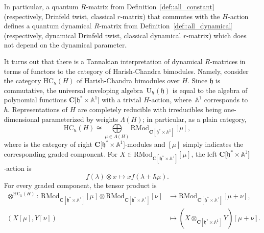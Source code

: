 \documentclass[pdftex]{sigma}
\numberwithin{equation}{section}
\newcommand{\C}{\mathbf{C}}
\newcommand{\U}{\mathrm{U}_{\hbar}}
\newcommand{\h}{\mathfrak{h}}
\newcommand{\HC}{\mathrm{HC}_{\hbar}}
\newcommand{\RMod}{\mathrm{RMod}}
\begin{document}
	\begin{Remark}
		In particular, a quantum $R$-matrix from Definition~\ref{def::all_constant} (respectively, Drinfeld twist, classical $r$-matrix) that commutes with the $H$-action defines a quantum dynamical $R$-matrix from Definition~\ref{def::all_dynamical} (respectively, dynamical Drinfeld twist, classical dynamical $r$-matrix) which does not depend on the dynamical parameter.
	\end{Remark}
	
	It turns out that there is a Tannakian interpretation of dynamical $R$-matrices in terms of functors to the category of Harish-Chandra bimodules. Namely, consider the category $\HC(H)$ of Harish-Chandra bimodules over $H$. Since $\h$ is commutative, the universal enveloping algebra~$\U(\h)$ is equal to the algebra of polynomial functions $\C\bigl[\h^* \times \mathbb{A}^1\bigr]$ with a trivial $H$-action, where~$\mathbb{A}^1$ corresponds to $\hbar$. Representations of $H$ are completely reducible with irreducibles being one-dimensional parameterized by weights $\Lambda(H)$; in particular, as a plain category,
	\[
	\HC(H) \cong \bigoplus\limits_{\mu \in \Lambda(H)} \RMod_{\C[\h^* \times \mathbb{A}^1]}[\mu],
	\]
	where \smash{$\RMod_{\C[\h \times \mathbb{A}^1]}$} is the category of right $\C\bigl[\h^* \times \mathbb{A}^1\bigr]$-modules and $[\mu]$ simply indicates the corresponding graded component. For $X\in \RMod_{\C[\h^* \times \mathbb{A}^1]}[\mu]$, the left $\C\bigl[\h^* \times \mathbb{A}^1\bigr]$-action is
	\begin{equation}
		\label{eq::hc_left_action}
		f(\lambda) \otimes x \mapsto x f(\lambda+\hbar \mu).
	\end{equation}
	For every graded component, the tensor product is
	\begin{align}
			\otimes^{\HC(H)}\colon\ \RMod_{\C[\h^* \times \mathbb{A}^1]} [\mu] \otimes \RMod_{\C[\h^* \times \mathbb{A}^1]} [\nu] & \rightarrow \RMod_{\C[\h^* \times \mathbb{A}^1]} [\mu+\nu],\nonumber \\
(X[\mu],Y[\nu]) & \mapsto (X \otimes_{\C[\h^* \times \mathbb{A}^1]} Y)[\mu+\nu].\label{eq::hc_h_tensor_product}
	\end{align}
	
\end{document}
